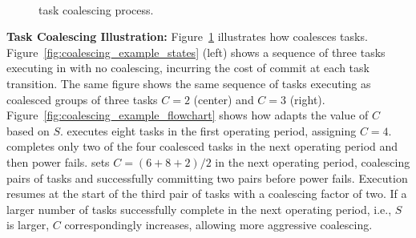 \begin{figure}
	\centering
	\\
	\caption{\sys task coalescing process.}
	\label{fig:coalescing_example}
\end{figure}

\noindent\textbf{Task Coalescing Illustration:} Figure~\ref{fig:coalescing_example} illustrates how \sys coalesces tasks. Figure~\ref{fig:coalescing_example_states} (left) shows a sequence of three tasks executing in \sys with no coalescing, incurring the cost of commit at each task transition. The same figure shows the same sequence of tasks executing as coalesced groups of three tasks $C=2$ (center) and $C=3$ (right). Figure~\ref{fig:coalescing_example_flowchart} shows how \sys adapts the value of $C$ based on $S$. \sys executes eight tasks in the first operating period, assigning $C=4$. \sys completes only two of the four coalesced tasks in the next operating period and then power fails. \sys sets $C=(6+8+2)/2$ in the next operating period, coalescing pairs of tasks and successfully committing two pairs before power fails. Execution resumes at the start of the third pair of tasks with a coalescing factor of two. If a larger number of tasks successfully complete in the next operating period, i.e., $S$ is larger, $C$ correspondingly increases, allowing more aggressive coalescing.

